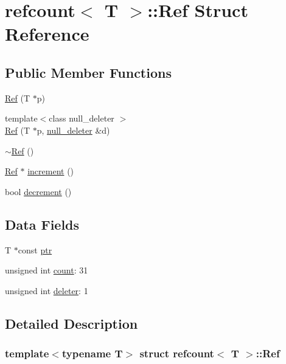 \hypertarget{structrefcount_1_1Ref}{}\section{refcount$<$ T $>$\+:\+:Ref Struct Reference}
\label{structrefcount_1_1Ref}
\subsection*{Public Member Functions}
\begin{DoxyCompactItemize}
\item 
\hyperlink{structrefcount_1_1Ref_a2c39ccf3dc44ae026d1c8060381831b6}{Ref} (T $\ast$p)
\item 
{\footnotesize template$<$class null\+\_\+deleter $>$ }\\\hyperlink{structrefcount_1_1Ref_a68eead7694eb1503d6da6ff95e668d90}{Ref} (T $\ast$p, \hyperlink{structnull__deleter}{null\+\_\+deleter} \&d)
\item 
\hyperlink{structrefcount_1_1Ref_a12a475bb77a4c7dbc5cfdeceadbfd49f}{$\sim$\+Ref} ()
\item 
\hyperlink{structrefcount_1_1Ref}{Ref} $\ast$ \hyperlink{structrefcount_1_1Ref_ae0677f2cf5a1ae75ab7af012f984cbce}{increment} ()
\item 
bool \hyperlink{structrefcount_1_1Ref_aca3389ae7d90d2129375f8f33d92a027}{decrement} ()
\end{DoxyCompactItemize}
\subsection*{Data Fields}
\begin{DoxyCompactItemize}
\item 
T $\ast$const \hyperlink{structrefcount_1_1Ref_a7654efec68cf42693832a4f61290047d}{ptr}
\item 
unsigned int \hyperlink{structrefcount_1_1Ref_a7b5dc1520b87e74e2d6cdf3aa10e7eb3}{count}\+: 31
\item 
unsigned int \hyperlink{structrefcount_1_1Ref_ad7fc9f0038e4ea880e726c46d4066cce}{deleter}\+: 1
\end{DoxyCompactItemize}


\subsection{Detailed Description}
\subsubsection*{template$<$typename T$>$\newline
struct refcount$<$ T $>$\+::\+Ref}



